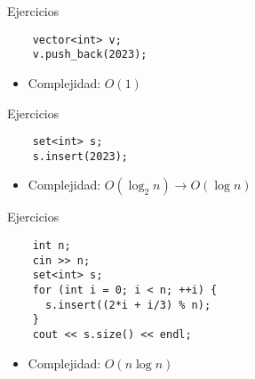 \documentclass[10pt]{beamer}
\newcommand{\bi}{\begin{itemize}}
\newcommand{\ei}{\end{itemize}}
\begin{document}
\begin{frame}[fragile]{Ejercicios}
  \begin{verbatim}
    vector<int> v;
    v.push_back(2023);
  \end{verbatim}
  \bi
    \item Complejidad:  $O(1)$
  \ei
\end{frame}

\begin{frame}[fragile]{Ejercicios}
  \begin{verbatim}
    set<int> s;
    s.insert(2023);
  \end{verbatim}
  \bi
    \item Complejidad:  $O(\log_2 n) \rightarrow O(\log n)$
  \ei
\end{frame}

\begin{frame}[fragile]{Ejercicios}
  \begin{verbatim}
    int n;
    cin >> n;
    set<int> s;
    for (int i = 0; i < n; ++i) {
      s.insert((2*i + i/3) % n);
    }
    cout << s.size() << endl;
  \end{verbatim}
  \bi
    \item Complejidad:  $O(n \log n)$
  \ei
\end{frame}
\end{document}
